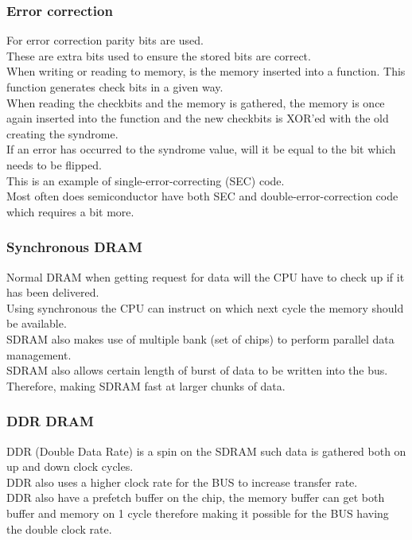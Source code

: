 \documentclass[12pt, a4paper]{article}
\begin{document}
			\subsubsection{Error correction}
				For error correction parity bits are used.\\
				These are extra bits used to ensure the stored bits are correct.\\
				When writing or reading to memory, is the memory inserted into a function. This function generates check bits in a given way.\\
				When reading the checkbits and the memory is gathered, the memory is once again inserted into the function and the new checkbits is XOR'ed with the old creating the syndrome.\\
				If an error has occurred to the syndrome value, will it be equal to the bit which needs to be flipped.\\
				This is an example of single-error-correcting (SEC) code.\\
				Most often does semiconductor have both SEC and double-error-correction code which requires a bit more.\\
			\subsubsection{Synchronous DRAM}
				Normal DRAM when getting request for data will the CPU have to check up if it has been delivered.\\
				Using synchronous the CPU can instruct on which next cycle the memory should be available.\\
				SDRAM also makes use of multiple bank (set of chips) to perform parallel data management.\\
				SDRAM also allows certain length of burst of data to be written into the bus. Therefore, making SDRAM fast at larger chunks of data.\\
			\subsubsection{DDR DRAM}
				DDR (Double Data Rate) is a spin on the SDRAM such data is gathered both on up and down clock cycles.\\
				DDR also uses a higher clock rate for the BUS to increase transfer rate.\\
				DDR also have a prefetch buffer on the chip, the memory buffer can get both buffer and memory on 1 cycle therefore making it possible for the BUS having the double clock rate.\\
\end{document}

